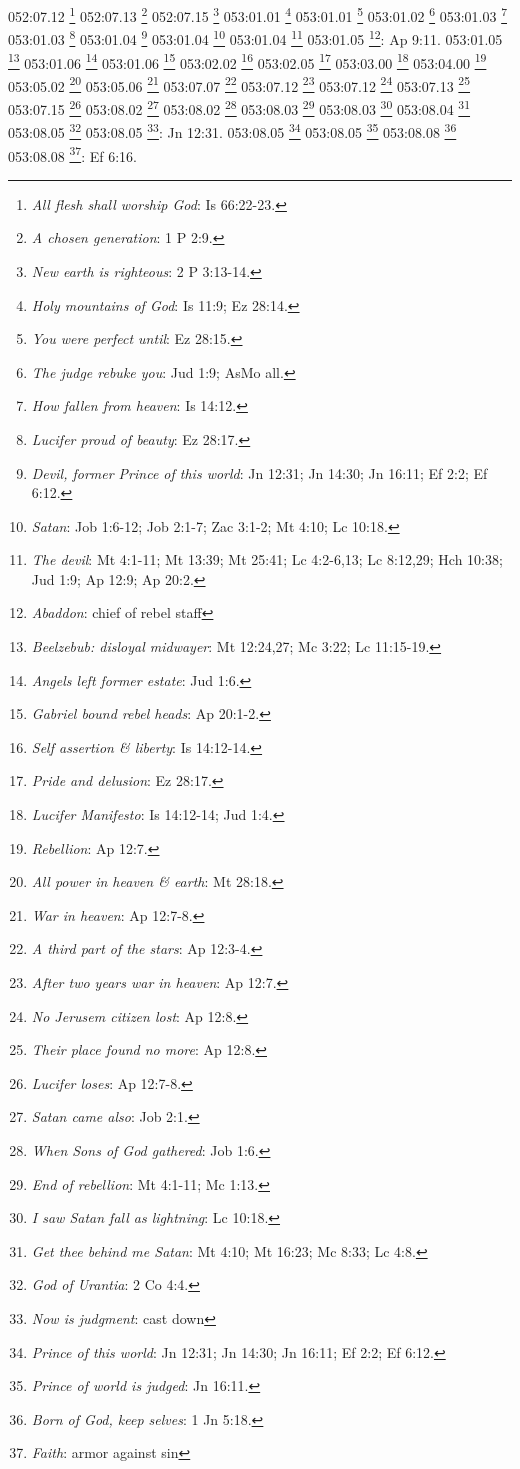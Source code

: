 {{{{{{{{{{{{{{{{{{{{{{052:07.12 \footnote{\textit{All flesh shall worship God}: Is 66:22-23.}
052:07.13 \footnote{\textit{A chosen generation}: 1 P 2:9.}
052:07.15 \footnote{\textit{New earth is righteous}: 2 P 3:13-14.}
053:01.01 \footnote{\textit{Holy mountains of God}: Is 11:9; Ez 28:14.}
053:01.01 \footnote{\textit{You were perfect until}: Ez 28:15.}
053:01.02 \footnote{\textit{The judge rebuke you}: Jud 1:9; AsMo all.}
053:01.03 \footnote{\textit{How fallen from heaven}: Is 14:12.}
053:01.03 \footnote{\textit{Lucifer proud of beauty}: Ez 28:17.}
053:01.04 \footnote{\textit{Devil, former Prince of this world}: Jn 12:31; Jn 14:30; Jn 16:11; Ef 2:2; Ef 6:12.}
053:01.04 \footnote{\textit{Satan}: Job 1:6-12; Job 2:1-7; Zac 3:1-2; Mt 4:10; Lc 10:18.}
053:01.04 \footnote{\textit{The devil}: Mt 4:1-11; Mt 13:39; Mt 25:41; Lc 4:2-6,13; Lc 8:12,29; Hch 10:38; Jud 1:9; Ap 12:9; Ap 20:2.}
053:01.05 \footnote{\textit{Abaddon}: chief of rebel staff}: Ap 9:11.}
053:01.05 \footnote{\textit{Beelzebub: disloyal midwayer}: Mt 12:24,27; Mc 3:22; Lc 11:15-19.}
053:01.06 \footnote{\textit{Angels left former estate}: Jud 1:6.}
053:01.06 \footnote{\textit{Gabriel bound rebel heads}: Ap 20:1-2.}
053:02.02 \footnote{\textit{Self assertion & liberty}: Is 14:12-14.}
053:02.05 \footnote{\textit{Pride and delusion}: Ez 28:17.}
053:03.00 \footnote{\textit{Lucifer Manifesto}: Is 14:12-14; Jud 1:4.}
053:04.00 \footnote{\textit{Rebellion}: Ap 12:7.}
053:05.02 \footnote{\textit{All power in heaven & earth}: Mt 28:18.}
053:05.06 \footnote{\textit{War in heaven}: Ap 12:7-8.}
053:07.07 \footnote{\textit{A third part of the stars}: Ap 12:3-4.}
053:07.12 \footnote{\textit{After two years war in heaven}: Ap 12:7.}
053:07.12 \footnote{\textit{No Jerusem citizen lost}: Ap 12:8.}
053:07.13 \footnote{\textit{Their place found no more}: Ap 12:8.}
053:07.15 \footnote{\textit{Lucifer loses}: Ap 12:7-8.}
053:08.02 \footnote{\textit{Satan came also}: Job 2:1.}
053:08.02 \footnote{\textit{When Sons of God gathered}: Job 1:6.}
053:08.03 \footnote{\textit{End of rebellion}: Mt 4:1-11; Mc 1:13.}
053:08.03 \footnote{\textit{I saw Satan fall as lightning}: Lc 10:18.}
053:08.04 \footnote{\textit{Get thee behind me Satan}: Mt 4:10; Mt 16:23; Mc 8:33; Lc 4:8.}
053:08.05 \footnote{\textit{God of Urantia}: 2 Co 4:4.}
053:08.05 \footnote{\textit{Now is judgment}: cast down}: Jn 12:31.}
053:08.05 \footnote{\textit{Prince of this world}: Jn 12:31; Jn 14:30; Jn 16:11; Ef 2:2; Ef 6:12.}
053:08.05 \footnote{\textit{Prince of world is judged}: Jn 16:11.}
053:08.08 \footnote{\textit{Born of God, keep selves}: 1 Jn 5:18.}
053:08.08 \footnote{\textit{Faith}: armor against sin}: Ef 6:16.}
}}}}}}}}}}}}}}}}}}}

